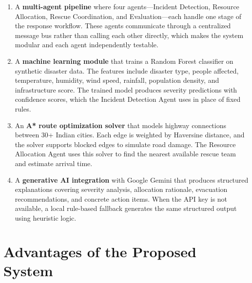 \begin{enumerate}[leftmargin=*]
    \item A \textbf{multi-agent pipeline} where four agents---Incident Detection, Resource Allocation, Rescue Coordination, and Evaluation---each handle one stage of the response workflow. These agents communicate through a centralized message bus rather than calling each other directly, which makes the system modular and each agent independently testable.

    \item A \textbf{machine learning module} that trains a Random Forest classifier on synthetic disaster data. The features include disaster type, people affected, temperature, humidity, wind speed, rainfall, population density, and infrastructure score. The trained model produces severity predictions with confidence scores, which the Incident Detection Agent uses in place of fixed rules.

    \item An \textbf{A* route optimization solver} that models highway connections between 30+ Indian cities. Each edge is weighted by Haversine distance, and the solver supports blocked edges to simulate road damage. The Resource Allocation Agent uses this solver to find the nearest available rescue team and estimate arrival time.

    \item A \textbf{generative AI integration} with Google Gemini that produces structured explanations covering severity analysis, allocation rationale, evacuation recommendations, and concrete action items. When the API key is not available, a local rule-based fallback generates the same structured output using heuristic logic.
\end{enumerate}

\section{Advantages of the Proposed System}
\label{sec:advantages_proposed}

